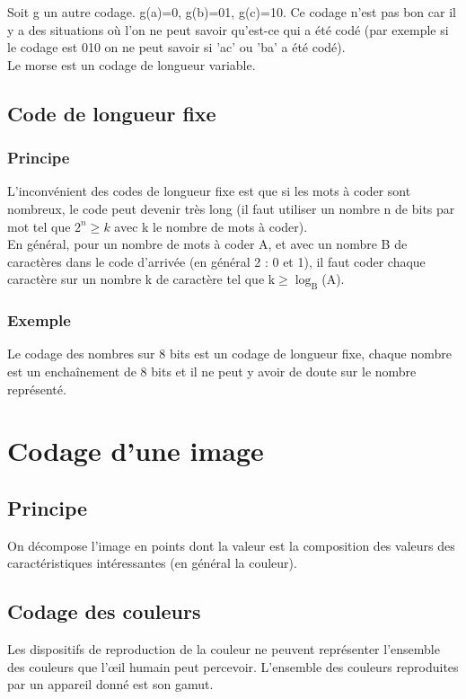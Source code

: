 \documentclass[a4paper,10pt]{book}
\begin{document}
Soit g un autre codage. g(a)=0, g(b)=01, g(c)=10. Ce codage n'est pas bon car il y a des situations où l'on ne peut savoir qu'est-ce qui a été codé (par exemple si le codage est 010 on ne peut savoir si 'ac' ou 'ba' a été codé).\\

Le morse est un codage de longueur variable.

\subsection{Code de longueur fixe}
\subsubsection{Principe}
L'inconvénient des codes de longueur fixe est que si les mots à coder sont nombreux, le code peut devenir très long (il faut utiliser un nombre n de bits par mot tel que $2^{n}\geq k$ avec k le nombre de mots à coder).\\

En général, pour un nombre de mots à coder A, et avec un nombre B de caractères dans le code d'arrivée (en général 2 : 0 et 1), il faut coder chaque caractère sur un nombre k de caractère tel que k$\geq \log_{\text{B}}$(A).

\subsubsection{Exemple}
Le codage des nombres sur 8 bits est un codage de longueur fixe, chaque nombre est un enchaînement de 8 bits et il ne peut y avoir de doute sur le nombre représenté.

\newpage

\section{Codage d'une image}
\subsection{Principe}
On décompose l’image en points dont la valeur est la composition des valeurs des caractéristiques intéressantes (en général la couleur).

\subsection{Codage des couleurs}
Les dispositifs de reproduction de la couleur ne peuvent représenter l’ensemble des couleurs que l’œil humain peut percevoir. L’ensemble des couleurs reproduites par un appareil donné est son gamut.\\
\end{document}

